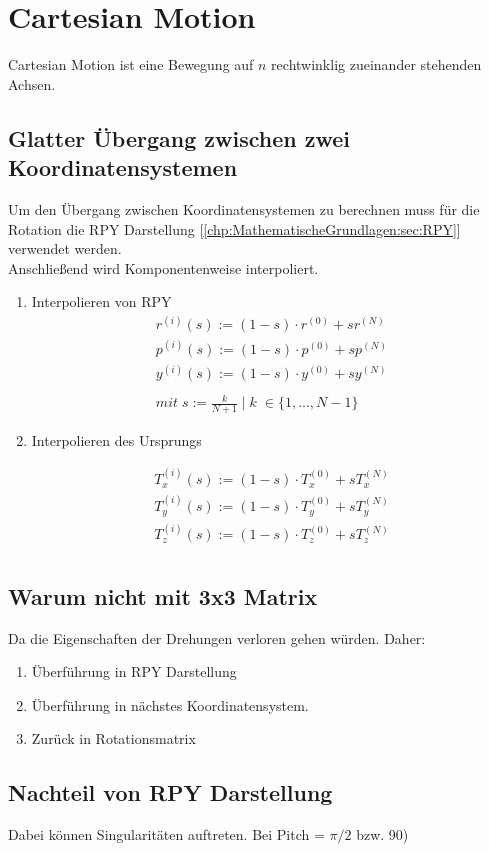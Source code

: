 \chapter{Cartesian Motion}
\label{chp:cartesianMotion}
Cartesian Motion ist eine Bewegung auf $n$ rechtwinklig zueinander stehenden Achsen.

\section{Glatter Übergang zwischen zwei Koordinatensystemen}
Um den Übergang zwischen Koordinatensystemen zu berechnen muss für die Rotation die RPY Darstellung [\ref{chp:MathematischeGrundlagen:sec:RPY}] verwendet werden. \\
Anschließend wird Komponentenweise interpoliert.


\begin{enumerate}
\item Interpolieren von RPY
\begin{equation}
		\begin{array}{l}
		r^{(i)}(s) := (1 - s) \cdot r^{(0)} + sr^{(N)}
 \\
		p^{(i)}(s) := (1 - s) \cdot p^{(0)} + sp^{(N)}
\\
		y^{(i)}(s) := (1 - s) \cdot y^{(0)} + sy^{(N)}
\\
		\\
		mit \; s := \frac{k}{N+1} \;|\; k \; \in \{1,...,N-1\}
		
		
		\end{array}
\end{equation}

\item Interpolieren des Ursprungs

\begin{equation}
\begin{array}{l}
T_x^{(i)}(s) := (1 - s) \cdot T_x^{(0)} + sT_x^{(N)}
\\
T_y^{(i)}(s) := (1 - s) \cdot T_y^{(0)} + sT_y^{(N)}
\\
T_z^{(i)}(s) := (1 - s) \cdot T_z^{(0)} + sT_z^{(N)} \\
\end{array}
\end{equation} 	
\end{enumerate}


\section{Warum nicht mit 3x3 Matrix}
Da die Eigenschaften der Drehungen verloren gehen würden. Daher:

\begin{enumerate}
	\item Überführung in RPY Darstellung
	\item Überführung in nächstes Koordinatensystem.
	\item Zurück in Rotationsmatrix
\end{enumerate}

\section{Nachteil von RPY Darstellung}
Dabei können Singularitäten auftreten. Bei Pitch = $\pi/2 $ bzw. 90\textdegree) \\
